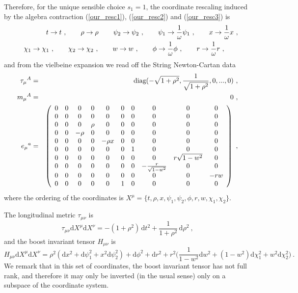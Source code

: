 \documentclass[12pt]{article}
\def\dd{\text{d}}
\numberwithin{equation}{section}
\begin{document}
\begin{appendices}
Therefore, for the unique sensible choice $s_1 = 1$, the coordinate rescaling  induced by the algebra contraction (\ref{our_resc1}),  (\ref{our_resc2}) and (\ref{our_resc3}) is
\begin{eqnarray}
\notag
&&t \rightarrow t \ , \qquad
\rho \rightarrow \rho \, \qquad
\psi_2 \rightarrow \psi_2 \ , \qquad
\psi_1 \rightarrow \frac{1}{\omega} \psi_1 \ , \qquad
x \rightarrow  \frac{1}{\omega} x \ ,  \\
&&\chi_1 \rightarrow \chi_1 \ , \qquad
\chi_2 \rightarrow \chi_2 \ , \qquad
w \rightarrow w \ , \qquad
\phi \rightarrow \frac{1}{\omega} \phi \ , \qquad
r \rightarrow \frac{1}{\omega} r \ , \qquad
\end{eqnarray}
and from the vielbeine expansion we read off the String Newton-Cartan data
\begin{eqnarray}
\notag
\tau_{\mu}{}^A &=& \text{diag} ( - \sqrt{1+\rho^2},  \frac{1}{\sqrt{1+\rho^2}}, 0, ..., 0) \ ,  \\
m_{\mu}{}^A &=& 0 \ , \\
\notag
e_{\mu}{}^a &=& \left(
\begin{array}{cccccccccc}
 0 & 0 & 0 & 0 & 0 & 0 & 0 & 0 & 0 & 0 \\
 0 & 0 & 0 & 0 & 0 & 0 & 0 & 0 & 0 & 0 \\
 0 & 0 & 0 & \rho  & 0 & 0 & 0 & 0 & 0 & 0
   \\
 0 & 0 & -\rho  & 0 & 0 & 0 & 0 & 0 & 0 &
   0 \\
 0 & 0 & 0 & 0 & - \rho  x & 0 & 0 & 0 &
   0 & 0 \\
 0 & 0 & 0 & 0 & 0 & 0 & 1 & 0 & 0 & 0 \\
 0 & 0 & 0 & 0 & 0 & 0 & 0 & 0 & r
   \sqrt{1-w^2} & 0 \\
 0 & 0 & 0 & 0 & 0 & 0 & 0 &
   -\frac{r}{\sqrt{1-w^2}} & 0 & 0 \\
 0 & 0 & 0 & 0 & 0 & 0 & 0 & 0 & 0 & -r w
   \\
 0 & 0 & 0 & 0 & 0 & 1 & 0 & 0 & 0 & 0 \\
\end{array}
\right) \ ,
\end{eqnarray}
where the ordering of the coordinates is $X^{\mu} = \{t,  \rho, x, \psi_1, \psi_2, \phi, r, w, \chi_1, \chi_2\}$. 

The longitudinal metric $\tau_{\mu\nu}$ is 
\begin{equation}
\tau_{\mu\nu} \dd X^{\mu} \dd X^{\nu} = - (1+ \rho^2) \,  \dd t^2 + \frac{1}{1+ \rho^2} \, \dd \rho^2 \ ,
\end{equation}
and the boost invariant tensor $H_{\mu\nu}$ is 
\begin{equation}
\label{H_polar}
H_{\mu\nu} \dd X^{\mu} \dd X^{\nu} = \rho^2 ( \dd x^2 + \dd \psi_1^2 + x^2 \dd \psi_2^2) + \dd \phi^2 + \dd r^2 + r^2 \bigg( \frac{1}{1-w^2} \dd w^2 + (1-w^2) \dd \chi_1^2 + w^2 \dd \chi_2^2\bigg) \ .
\end{equation}
We remark that in this set of coordinates, the boost invariant tensor has not full rank, and therefore it may only be inverted (in the usual sense) only on a subspace of the coordinate system.


\end{appendices}
\end{document}
